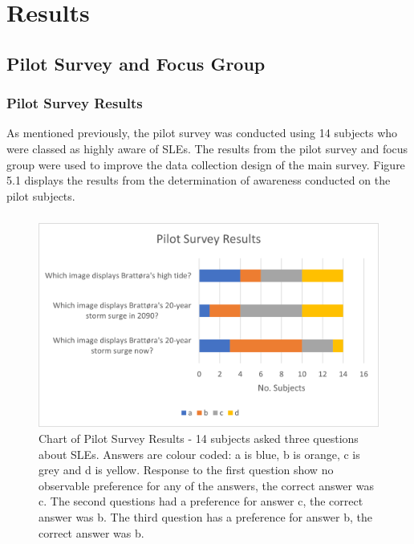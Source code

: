 \chapter{Results}

\section{Pilot Survey and Focus Group}

\subsection{Pilot Survey Results}
As mentioned previously, the pilot survey was conducted using 14 subjects who were classed as highly aware of SLEs. The results from the pilot survey and focus group were used to improve the data collection design of the main survey. Figure 5.1 displays the results from the determination of awareness conducted on the pilot subjects.
\paragraph{}

\begin{figure}[H]
    \centering
    \includegraphics{fig_results/pilot_survey_results.png}
    \caption{Chart of Pilot Survey Results - 14 subjects asked three questions about SLEs. Answers are colour coded: a is blue, b is orange, c is grey and d is yellow. Response to the first question show no observable preference for any of the answers, the correct answer was c. The second questions had a preference for answer c, the correct answer was b. The third question has a preference for answer b, the correct answer was b.}
    \label{fig:pilot_survey_results}
\end{figure}


